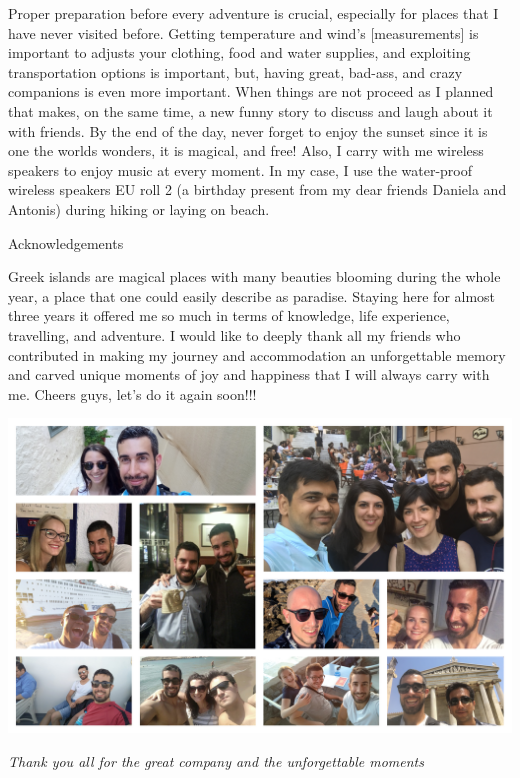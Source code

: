 \documentclass[10pt,a4paper]{article} %
\newcommand{\NewsItem}[1]{ %
\usefont{T1}{fvs}{n}{n} %
\vspace{24pt}\large #1\vspace{3pt} %
\par \normalsize \normalfont}
\begin{document}
\begin{multicols}{3}
Proper preparation before every adventure is crucial, especially for places that I 
have never visited before. 
Getting temperature and wind's [measurements] is important to adjusts your clothing, 
food and water supplies, and exploiting transportation options is important, but, 
having great, bad-ass, and crazy companions is even more important. 
When things are not proceed as I planned that makes, on the same time, a new funny 
story to discuss and laugh about it with friends.     
By the end of the day, never forget to enjoy the sunset since it is one the worlds 
wonders, it is magical, and free! 
Also, I carry with me wireless speakers to enjoy music at every moment. 
In my case, I use the water-proof wireless speakers EU roll 2 (a birthday present 
from my dear friends Daniela and Antonis) during hiking or laying on beach. 


\NewsItem{Acknowledgements}

Greek islands are magical places with many beauties blooming during the whole year, 
a place that one could easily describe as paradise. 
Staying here for almost three years it offered me so much in terms of knowledge, 
life experience, travelling, and adventure. 
I would like to deeply thank all my friends who contributed in making my journey 
and accommodation an unforgettable memory and carved unique moments of joy 
and happiness that I will always carry with me. 
Cheers guys, let's do it again soon!!!


\end{multicols}

\begin{center}
	\includegraphics[width=1\textwidth]{media/my_friends}
	\par\textit{Thank you all for the great company and the unforgettable moments}
\end{center}
\end{document}
